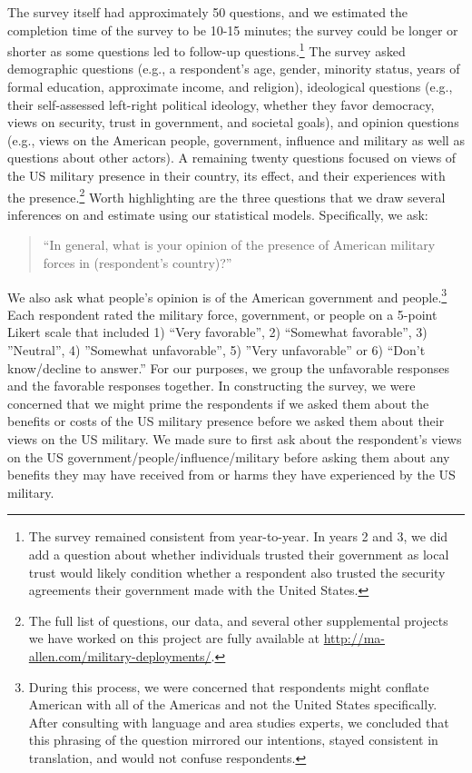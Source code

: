 The survey itself had approximately 50 questions, and we estimated the completion time of the survey to be 10-15 minutes; the survey could be longer or shorter as some questions led to follow-up questions.\footnote{The survey remained consistent from year-to-year. In years 2 and 3, we did add a question about whether individuals trusted their government as local trust would likely condition whether a respondent also trusted the security agreements their government made with the United States.} The survey asked demographic questions (e.g., a respondent's age, gender, minority status, years of formal education, approximate income, and religion), ideological questions (e.g., their self-assessed left-right political ideology, whether they favor democracy, views on security, trust in government, and societal goals), and opinion questions (e.g., views on the American people, government, influence and military as well as questions about other actors). A remaining twenty questions focused on views of the US military presence in their country, its effect, and their experiences with the presence.\footnote{The full list of questions, our data, and several other supplemental projects we have worked on this project are fully available at \url{http://ma-allen.com/military-deployments/}.} Worth highlighting are the three questions that we draw several inferences on and estimate using our statistical models. Specifically, we ask:

	\begin{quote}
		``In general, what is your opinion of the presence of American military forces in (respondent's
		country)?''
	\end{quote}

We also ask what people's opinion is of the American government and people.\footnote{During this process, we were concerned that respondents might conflate American with all of the Americas and not the United States specifically. After consulting with language and area studies experts, we concluded that this phrasing of the question mirrored our intentions, stayed consistent in translation, and would not confuse respondents.} Each respondent rated the military force, government, or people on a 5-point Likert scale that included 1) ``Very favorable'', 2) ``Somewhat favorable'', 3) ''Neutral'', 4) ''Somewhat unfavorable'', 5) ''Very unfavorable'' or 6) ``Don't know/decline to answer.'' For our purposes, we group the unfavorable responses and the favorable responses together. In constructing the survey, we were concerned that we might prime the respondents if we asked them about the benefits or costs of the US military presence before we asked them about their views on the US military. We made sure to first ask about the respondent's views on the US government/people/influence/military before asking them about any benefits they may have received from or harms they have experienced by the US military.

